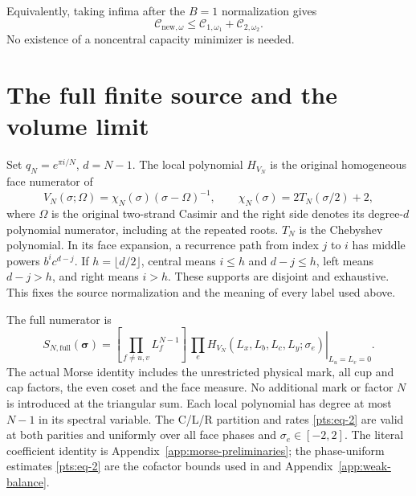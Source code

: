 Equivalently, taking infima after the \(B=1\) normalization gives \begin{equation}\label{pts:eq-18}
\mathcal C_{\mathrm{new},\omega}
       \le\mathcal C_{1,\omega_1}+\mathcal C_{2,\omega_2}.
\end{equation} No existence of a noncentral capacity minimizer is needed.

\section{The full finite source and the volume
limit}\label{pts:sec-5}

Set \(q_N=e^{\pi i/N}\), \(d=N-1\). The local polynomial \(H_{V_N}\) is
the original homogeneous face numerator of \begin{equation}\label{pts:eq-19a}
V_N(\sigma;\Omega)=\chi_N(\sigma)(\sigma-\Omega)^{-1},
 \qquad \chi_N(\sigma)=2T_N(\sigma/2)+2,
\end{equation} where \(\Omega\) is the original two-strand Casimir and the right
side denotes its degree-\(d\) polynomial numerator, including at the
repeated roots. \(T_N\) is the Chebyshev polynomial. In its face
expansion, a recurrence path from index \(j\) to \(i\) has middle powers
\(b^ic^{d-j}\). If \(h=\lfloor d/2\rfloor\), central means \(i\le h\) and
\(d-j\le h\), left means \(d-j>h\), and right means \(i>h\). These
supports are disjoint and exhaustive. This fixes the source
normalization and the meaning of every label used above.

The full numerator is \begin{equation}\label{pts:eq-19}
S_{N,\mathrm{full}}(\boldsymbol\sigma)
 =[\prod_{f\ne u,v}L_f^{N-1}]\,
       \left.\prod_eH_{V_N}(L_x,L_b,L_c,L_y;\sigma_e)
       \right|_{L_u=L_v=0}.
\end{equation} The actual Morse identity includes the unrestricted physical mark,
all cup and cap factors, the even coset and the face measure. No
additional mark or factor \(N\) is introduced at the triangular sum.
Each local polynomial has degree at most \(N-1\) in its spectral
variable. The C/L/R partition and rates \eqref{pts:eq-2} are valid at both parities
and uniformly over all face phases and \(\sigma_e\in[-2,2]\). The
literal coefficient identity is
Appendix~\ref{app:morse-preliminaries}; the phase-uniform estimates \eqref{pts:eq-2} are the cofactor
bounds used in \cite[Theorem 1.1]{CasimirSources} and Appendix~\ref{app:weak-balance}.


